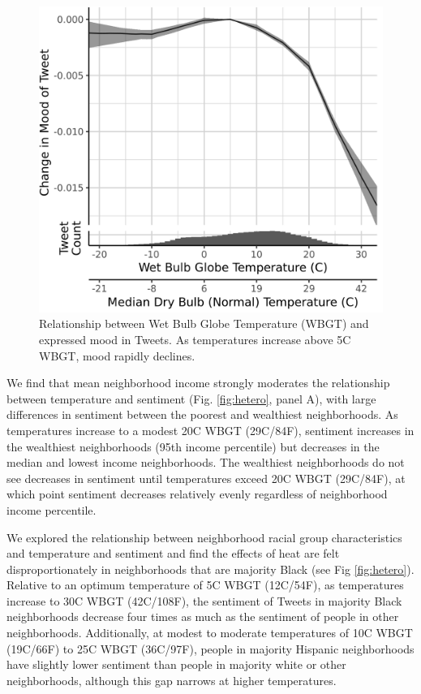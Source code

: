 \documentclass[fleqn,10pt]{wlscirep}
\begin{document}
\begin{figure}[H]
  \centering
  \includegraphics[width=0.5\linewidth]{../res/wbgt.png}
  \caption{Relationship between Wet Bulb Globe Temperature (WBGT) and expressed mood in Tweets.  As temperatures increase above 5\textdegree C WBGT, mood rapidly declines.}
  \label{fig:wbgt}
\end{figure}

We find that mean neighborhood income strongly moderates the relationship between temperature and sentiment (Fig. \ref{fig:hetero}, panel A), with large differences in sentiment between the poorest and wealthiest neighborhoods. As temperatures increase to a modest 20\textdegree C WBGT (29\textdegree C/84\textdegree F), sentiment increases in the wealthiest neighborhoods (95th income percentile) but decreases in the median and lowest income neighborhoods. The wealthiest neighborhoods do not see decreases in sentiment until temperatures exceed 20\textdegree C WBGT (29\textdegree C/84\textdegree F), at which point sentiment decreases relatively evenly regardless of neighborhood income percentile.

We explored the relationship between neighborhood racial group characteristics and temperature and sentiment and find the effects of heat are felt disproportionately in neighborhoods that are majority Black (see Fig \ref{fig:hetero}). Relative to an optimum temperature of 5\textdegree C WBGT (12\textdegree C/54\textdegree F), as temperatures increase to 30\textdegree C WBGT (42\textdegree C/108\textdegree F), the sentiment of Tweets in majority Black neighborhoods decrease four times as much as the sentiment of people in other neighborhoods. Additionally, at modest to moderate temperatures of 10\textdegree C WBGT (19\textdegree C/66\textdegree F) to 25\textdegree C WBGT (36\textdegree C/97\textdegree F), people in majority Hispanic neighborhoods have slightly lower sentiment than people in majority white or other neighborhoods, although this gap narrows at higher temperatures.
\end{document}
